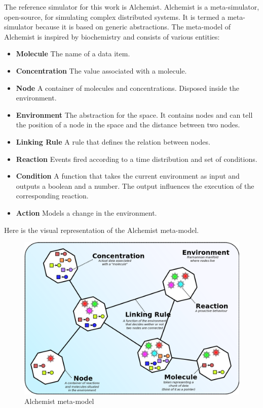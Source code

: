 \documentclass[12pt,a4paper,openright,twoside]{book}
\begin{document}
The reference simulator for this work is Alchemist. \cite{Pianini_2013}
Alchemist is a meta-simulator, open-source, for simulating complex distributed systems. It is termed a meta-simulator because it is based on generic abstractions.
The meta-model of Alchemist is inspired by biochemistry and consists of various entities:
\begin{itemize}
  \item \textbf{Molecule} The name of a data item.
  \item \textbf{Concentration} The value associated with a molecule.
  \item \textbf{Node} A container of molecules and concentrations. Disposed inside the environment.
  \item \textbf{Environment} The abstraction for the space. It contains nodes and can tell the position of a node in the space and the distance between two nodes.
  \item \textbf{Linking Rule} A rule that defines the relation between nodes.
  \item \textbf{Reaction} Events fired according to a time distribution and set of conditions.
  \item \textbf{Condition} A function that takes the current environment as input and outputs a boolean and a number. The output influences the execution of the corresponding reaction.
  \item \textbf{Action} Models a change in the environment.
\end{itemize}

Here is the visual representation of the Alchemist meta-model.

\begin{figure}[h]
  \centering
  \includegraphics[width=\textwidth]{figures/alchemist-model.png}
  \caption{Alchemist meta-model}
\end{figure}
\end{document}
